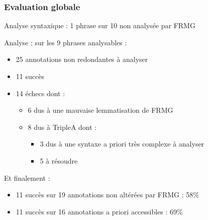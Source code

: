 \documentclass[smaller]{beamer}
\begin{document}
\begin{frame}
\frametitle{Evaluation globale}
\begin{block}{Analyse syntaxique :}
 1 phrase sur 10 non analysée par FRMG
\end{block}

\begin{block}{Analyse :}
 sur les 9 phrases analysables :
\begin{itemize}
\item 25 annotations non redondantes à analyser
\item 11 succès
\item 14 échecs dont :
   \begin{itemize}
   \item 6 dus à une mauvaise lemmatisation de FRMG
   \item 8 dus à TripleA dont :
       \begin{itemize}
       \item 3 dus à une syntaxe a priori très complexe à analyser
       \item 5 à résoudre
       \end{itemize}
   \end{itemize}
\end{itemize}
\end{block}

\begin{block}{Et finalement :}
\begin{itemize}
\item 11 succès sur 19 annotations non altérées par FRMG : 58\%
\item 11 succès sur 16 annotations a priori accessibles : 69\%
\end{itemize}
\end{block}
\end{frame}
\end{document}
